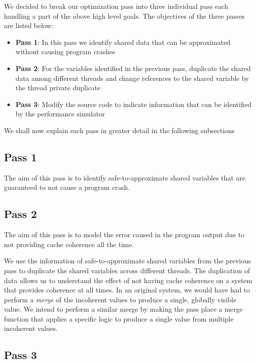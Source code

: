 \documentclass[12pt,conference]{IEEEtran}
\begin{document}
We decided to break our optimization pass into three individual pass each handling
a part of the above high level goals. The objectives of the three passes are listed 
below:
\begin{itemize}
\item \textbf{Pass 1}: In this pass we identify shared data that can be
approximated without causing program crashes
\item \textbf{Pass 2}: For the variables identified in the previous pass,
duplicate the shared data among different threads and change references to the
shared variable by the thread private duplicate
\item \textbf{Pass 3}: Modify the source code to indicate information that
can be identified by the performance simulator
\end{itemize}

We shall now explain each pass in greater detail in the following subsections

\subsection{Pass 1}

The aim of this pass is to identify safe-to-approximate shared variables
that are guaranteed to not cause a program crash.


\subsection{Pass 2}

The aim of this pass is to model the error caused in the program output
due to not providing cache coherence all the time.

We use the information of safe-to-approximate shared variables 
from the previous pass to 
duplicate the shared variables across different threads. The
duplication of data allows us to understand the effect of not having 
cache coherence on a system that provides coherence at all times. In an 
original system, we would have had to perform a \emph{merge} of the 
incoherent values to produce a single, globally visible value. We 
intend to perform a similar merge by making the pass place a merge 
function that applies a specific logic to produce a single value
from multiple incoherent values.

\subsection{Pass 3}
\end{document}
